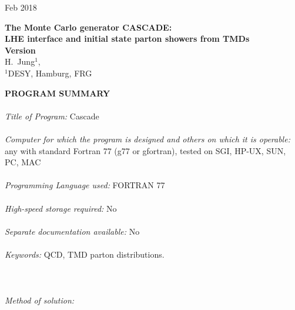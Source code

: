 \documentclass[11pt]{article} \usepackage{mystyle-new}
\newcommand{\cascadeversion}{~}
\def\cascade{{\sc Cascade}}
\def\katie{{\sc KaTie}}
\def\powheg{{\sc Powheg}}
\def\madgraph{{\sc MadGraph}}
\begin{document}
%
\begin{flushright}
 Feb 2018
\end{flushright}
\begin{center} {\sffamily\Large\bfseries 
The Monte Carlo generator CASCADE: \\ \vspace*{0.2cm}
LHE interface  and initial state parton showers from TMDs \\ \vspace*{0.2cm}
Version\cascadeversion\  \\  \vspace{0.5cm}}
{ \Large H.~Jung$^{1}$,}\\
      {\large $^1$DESY, Hamburg, FRG}\\
\end{center}
\begin{abstract}
The interface to read in LHE files into the  \cascade\ package is described.
The LHE files can be either files with off-shell initial state  partons, as
generated by the \katie\ package or also files which are generated by 
collinear fixed order calculations like \powheg\ or \madgraph , where a
transverse momentum of the initial state partons is added according to the
appropriate transverse momentum dependent (TMD) parton distribution.
\end{abstract} 
\newpage
{\sffamily\large\bfseries PROGRAM SUMMARY} \\ \\
{\em Title of Program:} \cascade\ \cascadeversion\ \\ \\
{\em Computer for which the program is designed and others on which it is
operable:}   any with standard Fortran 77 (g77 or gfortran), tested on 
                 SGI, HP-UX, SUN, PC, MAC\\ \\
{\em Programming Language used:}  FORTRAN 77 \\ \\
{\em High-speed storage required:}  No \\ \\
{\em Separate documentation available: } No \\ \\
{\em Keywords: } QCD, TMD parton distributions.\\ \\
\\ \\
{\em Method of solution:}  
\end{document}
